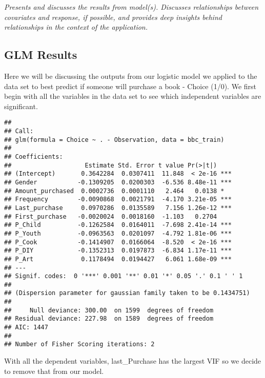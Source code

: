 \documentclass[
]{article}
\begin{document}
\emph{Presents and discusses the results from model(s). Discusses
relationships between covariates and response, if possible, and provides
deep insights behind relationships in the context of the application.}

\hypertarget{glm-results}{%
\subsection{GLM Results}\label{glm-results}}

Here we will be discussing the outputs from our logistic model we
applied to the data set to best predict if someone will purchase a book
- Choice (1/0). We first begin with all the variables in the data set to
see which independent variables are significant.

\begin{verbatim}
## 
## Call:
## glm(formula = Choice ~ . - Observation, data = bbc_train)
## 
## Coefficients:
##                    Estimate Std. Error t value Pr(>|t|)    
## (Intercept)       0.3642284  0.0307411  11.848  < 2e-16 ***
## Gender           -0.1309205  0.0200303  -6.536 8.48e-11 ***
## Amount_purchased  0.0002736  0.0001110   2.464   0.0138 *  
## Frequency        -0.0090868  0.0021791  -4.170 3.21e-05 ***
## Last_purchase     0.0970286  0.0135589   7.156 1.26e-12 ***
## First_purchase   -0.0020024  0.0018160  -1.103   0.2704    
## P_Child          -0.1262584  0.0164011  -7.698 2.41e-14 ***
## P_Youth          -0.0963563  0.0201097  -4.792 1.81e-06 ***
## P_Cook           -0.1414907  0.0166064  -8.520  < 2e-16 ***
## P_DIY            -0.1352313  0.0197873  -6.834 1.17e-11 ***
## P_Art             0.1178494  0.0194427   6.061 1.68e-09 ***
## ---
## Signif. codes:  0 '***' 0.001 '**' 0.01 '*' 0.05 '.' 0.1 ' ' 1
## 
## (Dispersion parameter for gaussian family taken to be 0.1434751)
## 
##     Null deviance: 300.00  on 1599  degrees of freedom
## Residual deviance: 227.98  on 1589  degrees of freedom
## AIC: 1447
## 
## Number of Fisher Scoring iterations: 2
\end{verbatim}

With all the dependent variables, last\_Purchase has the largest VIF so
we decide to remove that from our model.
\end{document}
